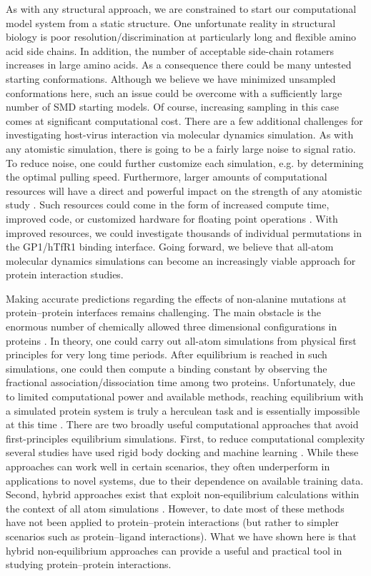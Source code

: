 \documentclass[12pt]{article}
\begin{document}
As with any structural approach, we are constrained to start our computational model system from a static structure. One unfortunate reality in structural biology is poor resolution/discrimination at particularly long and flexible amino acid side chains. In addition, the number of acceptable side-chain rotamers increases in large amino acids. As a consequence there could be many untested starting conformations. Although we believe we have minimized unsampled conformations here, such an issue could be overcome with a sufficiently large number of SMD starting models. Of course, increasing sampling in this case comes at significant computational cost. There are a few additional challenges for investigating host-virus interaction via molecular dynamics simulation. As with any atomistic simulation, there is going to be a fairly large noise to signal ratio. To reduce noise, one could further customize each simulation, e.g. by determining the optimal pulling speed. Furthermore, larger amounts of computational resources will have a direct and powerful impact on the strength of any atomistic study \citep{Shaw2012}. Such resources could come in the form of increased compute time, improved code, or customized hardware for floating point operations \citep{Shaw2011}. With improved resources, we could investigate thousands of individual permutations in the GP1/hTfR1 binding interface. Going forward, we believe that all-atom molecular dynamics simulations can become an increasingly viable approach for protein interaction studies. 

Making accurate predictions regarding the effects of non-alanine mutations at protein--protein interfaces remains  challenging. The main obstacle is the enormous number of chemically allowed three dimensional configurations in proteins \citep{Gumbart2012}. In theory, one could carry out all-atom simulations from physical first principles \citep{Gumbart2012} for very long time periods. After equilibrium is reached in such simulations, one could then compute a binding constant by observing the fractional association/dissociation time among two proteins. Unfortunately, due to limited computational power and available methods, reaching equilibrium with a simulated protein system is truly a herculean task and is essentially impossible at this time \citep{Gumbart2012}. There are two broadly useful computational approaches that avoid first-principles equilibrium simulations. First, to reduce computational complexity several studies have used rigid body docking and machine learning \citep{Vreven2011,Vreven2012,Bajaj2011,Hwang2010}. While these approaches can work well in certain scenarios, they often underperform in applications to novel systems, due to their dependence on available training data. Second, hybrid approaches exist that exploit non-equilibrium calculations within the context of all atom simulations \citep{Dixit2001,Is2001A,Is2001B,Park2004,Grant2011,Kortemme2004,Gumbart2012}. However, to date most of these methods have not been applied to protein--protein interactions (but rather to simpler scenarios such as protein--ligand interactions). What we have shown here is that hybrid non-equilibrium approaches can provide a useful and practical tool in studying protein--protein interactions.
\end{document}
